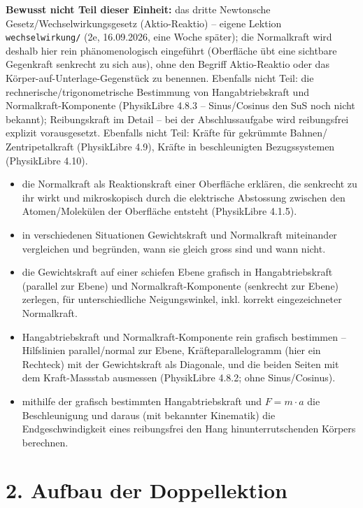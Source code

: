 \documentclass[11pt,a4paper]{article}
\begin{document}
\textbf{Bewusst nicht Teil dieser Einheit:} das dritte Newtonsche
Gesetz/Wechselwirkungsgesetz (Aktio-Reaktio) -- eigene Lektion
\texttt{wechselwirkung/} (2e, 16.09.2026, eine Woche später); die
Normalkraft wird deshalb hier rein phänomenologisch eingeführt (Oberfläche
übt eine sichtbare Gegenkraft senkrecht zu sich aus), ohne den Begriff
Aktio-Reaktio oder das Körper-auf-Unterlage-Gegenstück zu benennen.
Ebenfalls nicht Teil: die rechnerische/trigonometrische Bestimmung von
Hangabtriebskraft und Normalkraft-Komponente (PhysikLibre 4.8.3 --
Sinus/Cosinus den SuS noch nicht bekannt); Reibungskraft im Detail -- bei
der Abschlussaufgabe wird \glqq reibungsfrei\grqq{} explizit
vorausgesetzt. Ebenfalls nicht Teil: Kräfte für gekrümmte Bahnen/
Zentripetalkraft (PhysikLibre 4.9), Kräfte in beschleunigten
Bezugssystemen (PhysikLibre 4.10).

\begin{itemize}[leftmargin=1.3cm,itemsep=0.3em]
  \item[LZ1] die Normalkraft als Reaktionskraft einer Oberfläche
  erklären, die senkrecht zu ihr wirkt und mikroskopisch durch die
  elektrische Abstossung zwischen den Atomen/Molekülen der Oberfläche
  entsteht (PhysikLibre 4.1.5).
  \item[LZ2] in verschiedenen Situationen Gewichtskraft und Normalkraft
  miteinander vergleichen und begründen, wann sie gleich gross sind und
  wann nicht.
  \item[LZ3] die Gewichtskraft auf einer schiefen Ebene grafisch in
  Hangabtriebskraft (parallel zur Ebene) und Normalkraft-Komponente
  (senkrecht zur Ebene) zerlegen, für unterschiedliche Neigungswinkel,
  inkl. korrekt eingezeichneter Normalkraft.
  \item[LZ4] Hangabtriebskraft und Normalkraft-Komponente rein grafisch
  bestimmen -- Hilfslinien parallel/normal zur Ebene, Kräfteparallelogramm
  (hier ein Rechteck) mit der Gewichtskraft als Diagonale, und die beiden
  Seiten mit dem Kraft-Massstab ausmessen (PhysikLibre 4.8.2; ohne
  Sinus/Cosinus).
  \item[LZ5] mithilfe der grafisch bestimmten Hangabtriebskraft und
  $F=m\cdot a$ die Beschleunigung und daraus (mit bekannter Kinematik) die
  Endgeschwindigkeit eines reibungsfrei den Hang hinunterrutschenden
  Körpers berechnen.
\end{itemize}

\section*{2. Aufbau der Doppellektion}
\end{document}
